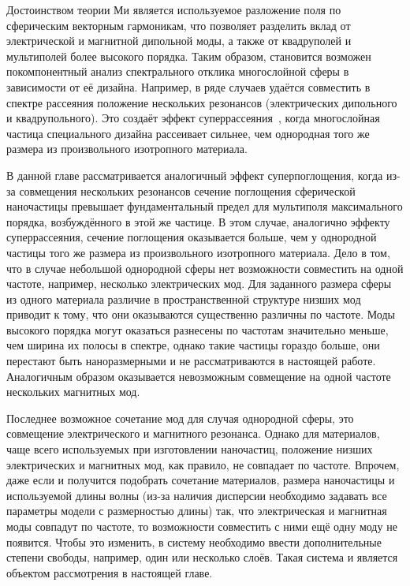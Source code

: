 Достоинством теории Ми является используемое разложение поля по
сферическим векторным гармоникам, что позволяет разделить вклад от
электрической и магнитной дипольной моды, а также от квадруполей и
мультиполей более высокого порядка. Таким образом, становится возможен
покомпонентный анализ спектрального отклика многослойной сферы в
зависимости от её дизайна. Например, в ряде случаев удаётся совместить
в спектре рассеяния положение нескольких резонансов (электрических
дипольного и квадрупольного). Это создаёт эффект
суперрассеяния~\cite{Fan-2010,Fan-2011}, когда многослойная частица
специального дизайна рассеивает сильнее, чем однородная того же
размера из произвольного изотропного материала.

В данной главе рассматривается аналогичный эффект суперпоглощения,
когда из-за совмещения нескольких резонансов сечение поглощения
сферической наночастицы превышает фундаментальный предел для
мультиполя максимального порядка, возбуждённого в этой же частице.  В
этом случае, аналогично эффекту суперрассеяния, сечение поглощения
оказывается больше, чем у однородной частицы того же размера из
произвольного изотропного материала. Дело в том, что в случае
небольшой однородной сферы нет возможности совместить на одной
частоте, например, несколько электрических мод. Для заданного размера
сферы из одного материала различие в пространственной структуре низших
мод приводит к тому, что они оказываются существенно различны по
частоте. Моды высокого порядка могут оказаться разнесены по частотам
значительно меньше, чем ширина их полосы в спектре, однако такие
частицы гораздо больше, они перестают быть наноразмерными и не
рассматриваются в настоящей работе. Аналогичным образом оказывается
невозможным совмещение на одной частоте нескольких магнитных мод.

Последнее возможное сочетание мод для случая однородной сферы, это
совмещение электрического и магнитного резонанса. Однако для
материалов, чаще всего используемых при изготовлении наночастиц,
положение низших электрических и магнитных мод, как правило, не
совпадает по частоте.  Впрочем, даже если и получится подобрать
сочетание материалов, размера наночастицы и используемой длины волны
(из-за наличия дисперсии необходимо задавать все
параметры модели с размерностью длины) так, что электрическая и
магнитная моды совпадут по частоте, то возможности совместить с ними
ещё одну моду не появится.  Чтобы это изменить, в систему необходимо
ввести дополнительные степени свободы, например, один или несколько
слоёв. Такая система и является объектом рассмотрения в
настоящей главе.

